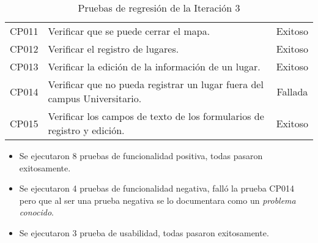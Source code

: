 \begin{table}[H]
\begin{center}
\begin{tabularx}{0.8\textwidth}{ c  X  c }
CP011
&
Verificar que se puede cerrar el mapa.
&
Exitoso \\

CP012
&
Verificar el registro de lugares.
&
Exitoso \\

CP013
&
Verificar la edición de la información de un lugar.
&
Exitoso \\


CP014
&
Verificar que no pueda registrar un lugar fuera del campus Universitario.
&
Fallada \\

CP015
&
Verificar los campos de texto de los formularios de registro y edición.
&
Exitoso \\


      \bottomrule
    \end{tabularx}
    \caption{Pruebas de regresión de la Iteración 3}
    \label{tab:regresion_3}
  \end{center}
\end{table}


\begin{itemize}
  \item Se ejecutaron 8 pruebas de funcionalidad positiva, todas pasaron exitosamente.
  \item Se ejecutaron 4 pruebas de funcionalidad negativa, falló la prueba CP014 pero que al ser una prueba negativa se lo documentara como un \emph{problema conocido}.
  \item Se ejecutaron 3 prueba de usabilidad, todas pasaron exitosamente.
\end{itemize}
